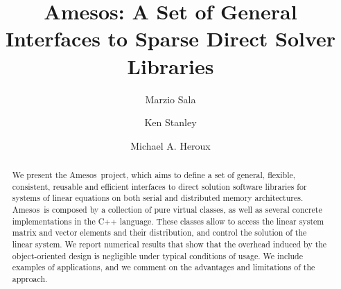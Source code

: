 \documentclass{llncs}
\newcommand{\amesos}{{\sc Amesos}}
\begin{document}
\pagestyle{headings} 
\mainmatter              %

\title{\amesos: A Set of General Interfaces to Sparse Direct Solver Libraries}
%
%
\author{Marzio Sala \and Ken Stanley \and
Michael A. Heroux}
%
%
%

\maketitle              %

\begin{abstract}
We present the \amesos\ project, which aims to define a set of general,
flexible, consistent, reusable and efficient interfaces to direct solution
software libraries for systems of linear equations on both serial and
distributed memory architectures. \amesos\ is composed by a collection of pure
virtual classes, as well as several concrete implementations in the C++
language. These classes allow to access the linear system matrix and vector
elements and their distribution, and control the solution of the linear
system. We report numerical results that show that the overhead induced by the
object-oriented design is negligible under typical conditions of usage. We
include examples of applications, and we comment on the advantages and
limitations of the approach.
\end{abstract}
\end{document}
